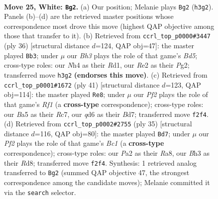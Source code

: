 \documentclass[11pt]{article}
\begin{document}
\clearpage

\begin{figure}[p]\centering
\begin{subfigure}{0.46\textwidth}\centering
\resizebox{\linewidth}{!}{%
\newchessgame
\chessboard[
  setfen={r1bn1k2/1ppp1ppp/p2q4/B2Pr1n1/Q6N/4P1PB/PP2RP1P/1R4K1 w - - 25 25},
  showmover=false,
  pgfstyle=straightmove, color=movearrow, markmove={h3-g2}
]}
\caption{}
\end{subfigure}\hfill
\begin{subfigure}{0.46\textwidth}\centering
\resizebox{\linewidth}{!}{%
\newchessgame
\chessboard[
  setfen={2b2rk1/r3pp1p/ppp2qp1/3Bn3/P7/2P1B2P/1KP1QPP1/3R3R w - - 0 19},
  showmover=false,
  pgfstyle=straightmove, color=movearrow, markmove={d5-b3}
]}
\caption{}
\end{subfigure}
\\[4pt]
\begin{subfigure}{0.46\textwidth}\centering
\resizebox{\linewidth}{!}{%
\newchessgame
\chessboard[
  setfen={5rk1/pprbbp1p/1n4p1/q1pp4/P2P2N1/2PQP2P/4NPP1/R2B1RK1 b - - 0 21},
  showmover=false,
  pgfstyle=straightmove, color=movearrow, markmove={f8-e8}
]}
\caption{}
\end{subfigure}\hfill
\begin{subfigure}{0.46\textwidth}\centering
\resizebox{\linewidth}{!}{%
\newchessgame
\chessboard[
  setfen={r1br2k1/1p2qpb1/2p1p1p1/p6p/2RPQ2P/1B2PN2/PP3PP1/2R3K1 b - - 3 18},
  showmover=false,
  pgfstyle=straightmove, color=movearrow, markmove={c8-d7}
]}
\caption{}
\end{subfigure}
\caption{\textbf{Move 25, White: \texttt{Bg2}.} (a) Our position; Melanie plays \texttt{Bg2} (\texttt{h3g2}). Panels (b)--(d) are the retrieved master positions whose correspondence most drove this move (highest QAP objective among those that transfer to it). (b) Retrieved from \texttt{ccrl\_top\_p0000\#3447} (ply 36) [structural distance $d$=124, QAP obj=47]: the master played \texttt{Bb3}; under $\mu$ our \emph{Bh3} plays the role of that game's \emph{Bd5}; cross-type roles: our \emph{N}h4 as their \emph{R}d1, our \emph{R}e2 as their \emph{P}g2; transferred move \texttt{h3g2} \textbf{(endorses this move)}. (c) Retrieved from \texttt{ccrl\_top\_p0001\#1672} (ply 41) [structural distance $d$=123, QAP obj=114]: the master played \texttt{Re8}; under $\mu$ our \emph{Pf2} plays the role of that game's \emph{Rf1} (a \textbf{cross-type} correspondence); cross-type roles: our \emph{B}a5 as their \emph{R}c7, our \emph{q}d6 as their \emph{B}d7; transferred move \texttt{f2f4}. (d) Retrieved from \texttt{ccrl\_top\_p0002\#2755} (ply 35) [structural distance $d$=116, QAP obj=80]: the master played \texttt{Bd7}; under $\mu$ our \emph{Pf2} plays the role of that game's \emph{Bc1} (a \textbf{cross-type} correspondence); cross-type roles: our \emph{P}a2 as their \emph{R}a8, our \emph{B}h3 as their \emph{R}d8; transferred move \texttt{f2f4}. Synthesis: 1 retrieved analog transferred to \texttt{Bg2} (summed QAP objective 47, the strongest correspondence among the candidate moves); Melanie committed it via the \texttt{search} selector.}
\label{fig:thought-m48}
\end{figure}
\end{document}
